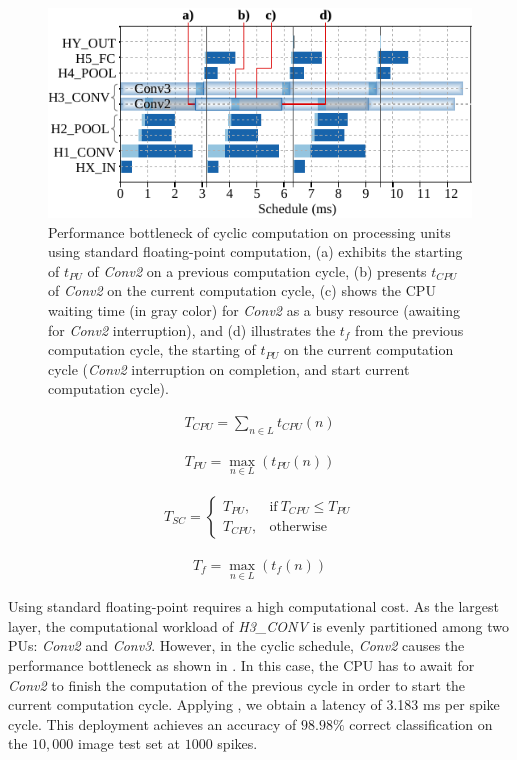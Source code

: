 \begin{figure}[h!]
	\centering
	\includegraphics[width=1\columnwidth]{../figures/latency_fp_cycle.pdf}
	\caption{Performance bottleneck of cyclic computation on processing units using standard floating-point computation, (a) exhibits the starting of $t_{PU}$ of \emph{Conv2} on a previous computation cycle, (b) presents $t_{CPU}$ of \emph{Conv2} on the current computation cycle, (c) shows the CPU waiting time (in gray color) for \emph{Conv2} as a busy resource (awaiting for \emph{Conv2} interruption), and (d) illustrates the $t_{f}$ from the previous computation cycle, the starting of $t_{PU}$ on the current computation cycle (\emph{Conv2} interruption on completion, and start current computation cycle).}
	\label{fig:latency_pu_fp_cycle}
\end{figure}

\begin{eqnarray} \label{eq:time_cpu}
T_{CPU} = \sum_{n\in L} t_{CPU}(n)
\end{eqnarray}

\begin{eqnarray} \label{eq:time_pu}
T_{PU} = \max_{n\in L}(t_{PU}(n))
\end{eqnarray}

\begin{eqnarray} \label{eq:time_spike}
T_{SC} =
\begin{cases}
T_{PU}, & \text{if}\ T_{CPU}\le T_{PU} \\
T_{CPU}, & \text{otherwise}
\end{cases}
\end{eqnarray}

\begin{eqnarray} \label{eq:time_finish}
T_{f} = \max_{n\in L}(t_{f}(n))
\end{eqnarray}

Using standard floating-point requires a high computational cost. As the largest layer, the computational workload of \emph{H3\_CONV} is evenly partitioned among two PUs: \emph{Conv2} and \emph{Conv3}. However, in the cyclic schedule, \emph{Conv2} causes the performance bottleneck as shown in . In this case, the CPU has to await for \emph{Conv2} to finish the computation of the previous cycle in order to start the current computation cycle. Applying , we obtain a latency of 3.183 ms per spike cycle. This deployment achieves an accuracy of $98.98\%$ correct classification on the $10,000$ image test set at $1000$ spikes.

